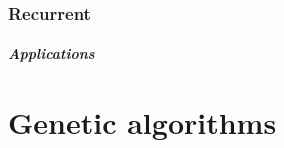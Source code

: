 \documentclass[10pt,a4paper,DIV=11]{scrreprt}
\begin{document}
\subsection{Recurrent}

\paragraph{Applications}




\chapter{Genetic algorithms}




\newpage


\listoffigures
\listoftables
\listofalgorithms
\lstlistoflistings

\newpage




\end{document}
